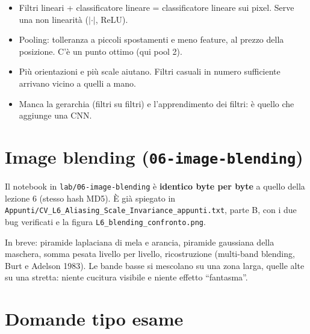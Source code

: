 \documentclass[11pt,a4paper]{article}
\newcommand{\code}[1]{\texttt{#1}}
\begin{document}
\begin{esame}
\begin{itemize}[leftmargin=*]
  \item Filtri lineari + classificatore lineare = classificatore lineare sui pixel. Serve una non linearità ($|\cdot|$, ReLU).
  \item Pooling: tolleranza a piccoli spostamenti e meno feature, al prezzo della posizione. C'è un punto ottimo (qui pool 2).
  \item Più orientazioni e più scale aiutano. Filtri casuali in numero sufficiente arrivano vicino a quelli a mano.
  \item Manca la gerarchia (filtri su filtri) e l'apprendimento dei filtri: è quello che aggiunge una CNN.
\end{itemize}
\end{esame}

\section{Image blending (\code{06-image-blending})}

Il notebook in \code{lab/06-image-blending} è \textbf{identico byte per byte} a quello della lezione 6 (stesso hash MD5). È già spiegato in \code{Appunti/CV\_L6\_Aliasing\_Scale\_Invariance\_appunti.txt}, parte B, con i due bug verificati e la figura \code{L6\_blending\_confronto.png}.

In breve: piramide laplaciana di mela e arancia, piramide gaussiana della maschera, somma pesata livello per livello, ricostruzione (multi-band blending, Burt e Adelson 1983). Le bande basse si mescolano su una zona larga, quelle alte su una stretta: niente cucitura visibile e niente effetto ``fantasma''.

\bigskip
\section{Domande tipo esame}
\end{document}
